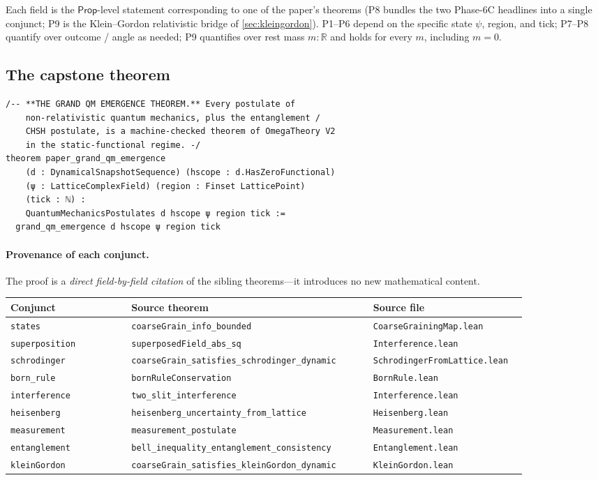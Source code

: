 \documentclass[11pt,a4paper,twoside]{article}
\theoremstyle{definition}
\newcommand{\Rbb}{\mathbb{R}}
\newcommand{\code}[1]{\texttt{#1}}
\newcommand{\Prop}{\mathsf{Prop}}
\begin{document}
Each field is the $\Prop$-level statement corresponding to one of
the paper's theorems (P8 bundles the two Phase-6C headlines into a
single conjunct; P9 is the Klein--Gordon relativistic bridge of
\cref{sec:kleingordon}). P1--P6 depend on the specific state $\psi$,
region, and tick; P7--P8 quantify over outcome / angle as needed; P9
quantifies over rest mass $m : \Rbb$ and holds for every $m$,
including $m = 0$.

\subsection{The capstone theorem}\label{sec:capstone-theorem}

\begin{lstlisting}
/-- **THE GRAND QM EMERGENCE THEOREM.** Every postulate of
    non-relativistic quantum mechanics, plus the entanglement /
    CHSH postulate, is a machine-checked theorem of OmegaTheory V2
    in the static-functional regime. -/
theorem paper_grand_qm_emergence
    (d : DynamicalSnapshotSequence) (hscope : d.HasZeroFunctional)
    (ψ : LatticeComplexField) (region : Finset LatticePoint)
    (tick : ℕ) :
    QuantumMechanicsPostulates d hscope ψ region tick :=
  grand_qm_emergence d hscope ψ region tick
\end{lstlisting}

\paragraph{Provenance of each conjunct.}
The proof is a \emph{direct field-by-field citation} of the sibling
theorems---it introduces no new mathematical content.

\begin{longtable}{@{}p{0.22\linewidth} p{0.44\linewidth} p{0.28\linewidth}@{}}
\toprule
Conjunct & Source theorem & Source file \\
\midrule
\endhead
\code{states} & \code{coarseGrain\_info\_bounded} & \code{CoarseGrainingMap.lean} \\
\code{superposition} & \code{superposedField\_abs\_sq} & \code{Interference.lean} \\
\code{schrodinger} & \code{coarseGrain\_satisfies\_schrodinger\_dynamic} & \code{SchrodingerFromLattice.lean} \\
\code{born\_rule} & \code{bornRuleConservation} & \code{BornRule.lean} \\
\code{interference} & \code{two\_slit\_interference} & \code{Interference.lean} \\
\code{heisenberg} & \code{heisenberg\_uncertainty\_from\_lattice} & \code{Heisenberg.lean} \\
\code{measurement} & \code{measurement\_postulate} & \code{Measurement.lean} \\
\code{entanglement} & \code{bell\_inequality\_entanglement\_consistency} & \code{Entanglement.lean} \\
\code{kleinGordon} & \code{coarseGrain\_satisfies\_kleinGordon\_dynamic} & \code{KleinGordon.lean} \\
\bottomrule
\end{longtable}
\end{document}
